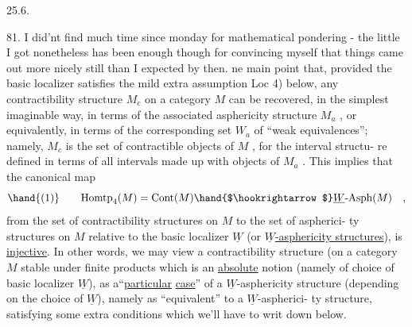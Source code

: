 
25.6.

81. I did'nt find much time since monday for mathematical pondering -
the little I got nonetheless has been enough though for convincing myself
that things came out  more nicely still than I expected by then. \hand{\unsure{--}} ne
main point  that, provided the basic localizer  satisfies the mild
extra assumption Loc 4) below, any contractibility structure $M_c$ on a
category $M$   can be recovered, in the simplest imaginable way, in
terms of the associated asphericity structure $M_a$ , or equivalently, in
terms of the corresponding set $W_a$ of ``weak equivalences''; namely, $M_c$
is the set of contractible objects of $M$ , for the   interval structu-%
re defined in terms of all intervals made up with objects of $M_a$  . This
implies that the canonical map
\[ \hand{(1)} \qquad \mathrm{Homtp}_4(M) = \mathrm{Cont}(M) \hand{$\hookrightarrow$} \underline{W}\text{-}\mathrm{Asph}(M) \quad , \]
from the set of contractibility structures on $M$ to the set of aspherici-%
ty structures on $M$ relative to the basic localizer $\underline{W}$ (or \uline{$\underline{W}$-asphericity
structures}), is \uline{injective}. In other words, we may view 
a contractibility structure (on a category $M$ stable under finite products\hand{),}
which is an \uline{absolute} notion (namely  of  choice of 
 basic localizer $\underline{W}$), as a``\uline{particular} \uline{case}'' of a $\underline{W}$-asphericity structure
(depending on the choice of $\underline{W}$), namely as ``equivalent'' to a $\underline{W}$-aspherici-%
ty structure, satisfying some extra conditions which we'll have to writ
down below. \hand{//}

